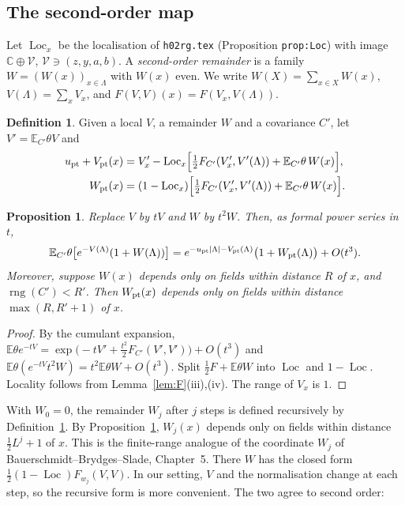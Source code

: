 \documentclass[11pt]{amsart}
\newtheorem{proposition}[theorem]{Proposition}
\theoremstyle{definition}
\newtheorem{definition}[theorem]{Definition}
\theoremstyle{remark}
\numberwithin{equation}{section}
\newcommand{\C}{\mathbb{C}}
\newcommand{\E}{\mathbb{E}}
\newcommand{\Loc}{\operatorname{Loc}}
\newcommand{\rng}{\operatorname{rng}}
\newcommand{\hr}{\texttt{h02rg.tex}}
\begin{document}
\subsection{The second-order map}
\label{sec:pt-map}
Let $\Loc_x$ be the localisation of \hr{} (Proposition \texttt{prop:Loc}) with
image $\C\oplus\mathcal V$, $\mathcal V\ni(z,y,a,b)$. A \emph{second-order remainder} is a
family $W=(W(x))_{x\in\Lambda}$ with $W(x)$ even. We write
$W(X)=\sum_{x\in X}W(x)$, $V(\Lambda)=\sum_xV_x$, and
$F(V,V)(x)=F(V_x,V(\Lambda))$.

\begin{definition}\label{def:Vpt}
Given a local $V$, a remainder $W$ and a covariance $C'$, let $V'=\E_{C'}\theta V$ and
\begin{align*}
  u_{\rm pt}+V_{\rm pt}(x)&=V'_x-\Loc_x\Bigl[\tfrac12F_{C'}(V'_x,V'(\Lambda))+\E_{C'}\theta\,W(x)\Bigr],\\
  W_{\rm pt}(x)&=(1-\Loc_x)\Bigl[\tfrac12F_{C'}(V'_x,V'(\Lambda))+\E_{C'}\theta\,W(x)\Bigr].
\end{align*}
\end{definition}

\begin{proposition}\label{prop:Vpt}
Replace $V$ by $tV$ and $W$ by $t^2W$. Then, as formal power series in $t$,
\[
  \E_{C'}\theta\bigl[e^{-V(\Lambda)}(1+W(\Lambda))\bigr]
  =e^{-u_{\rm pt}|\Lambda|-V_{\rm pt}(\Lambda)}\bigl(1+W_{\rm pt}(\Lambda)\bigr)+O(t^3).
\]
Moreover, suppose $W(x)$ depends only on fields within distance $R$ of $x$, and
$\rng(C')<R'$. Then $W_{\rm pt}(x)$ depends only on fields within distance
$\max(R,R'+1)$ of $x$.
\end{proposition}

\begin{proof}
By the cumulant expansion,
$\E\theta e^{-tV}=\exp\bigl(-tV'+\tfrac{t^2}2F_{C'}(V',V')\bigr)+O(t^3)$ and
$\E\theta(e^{-tV}t^2W)=t^2\E\theta W+O(t^3)$. Split $\frac12F+\E\theta W$
into $\Loc$ and $1-\Loc$. Locality follows from Lemma~\ref{lem:F}(iii),(iv). The range of
$V_x$ is $1$.
\end{proof}

With $W_0=0$, the remainder $W_j$ after $j$ steps is defined recursively by
Definition~\ref{def:Vpt}. By Proposition~\ref{prop:Vpt}, $W_j(x)$ depends only on fields
within distance $\frac12L^j+1$ of $x$. This is the finite-range analogue of the coordinate
$W_j$ of Bauerschmidt--Brydges--Slade, Chapter~5. There $W$ has the closed form
$\frac12(1-\Loc)F_{w_j}(V,V)$. In our setting, $V$ and the normalisation change at each step,
so the recursive form is more convenient. The two agree to second order:
\end{document}
